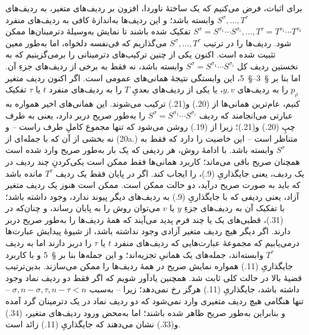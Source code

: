 \documentclass[11pt]{article}
\begin{document}
برای اثبات، فرض می‌کنیم که یک ساختهٔ ناوردا، افزون بر ردیف‌های متغیر، به ردیف‌های $S^\sigma,\ldots,T^\tau$ وابسته باشد؛ و این ردیف‌ها به‌اندازهٔ کافی به ردیف‌های منفرد $S^\sigma=S^{\sigma_1}\cdots S^{\sigma_i},\ldots,T^\tau=T^{\tau_1}\cdots T^{\tau_k}$ تفکیک شده باشند تا نمایش به‌وسیلهٔ دترمینان‌ها ممکن شود. ردیف‌ها را در ترتیب $S^\sigma,\ldots,T^\tau$ می‌گذاریم که فی‌نفسه دلخواه، اما به‌طور معین تثبیت شده است. اکنون یکی از چنین ترکیب‌های دترمینانی را برمی‌گزینیم که به نخستین ردیف کل $S^\sigma=S^{\sigma_1}\cdots S^{\sigma_i}$ وابسته باشد، نه فقط به برخی از ردیف‌های جزءِ آن. اما بنا بر \S\ 3--\S\ 5، این وابستگی نتیجهٔ همانی‌های عمومی است. اگر اکنون ردیف متغیر $p_\rho$ را به ردیف‌های $y,v$، یا یکی از ردیف‌های بعدیِ $T$ را به ردیف‌های منفرد $t$ یا $\tau$ تفکیک کنیم، عام‌ترین همانی‌ها از (20.) و(21.) ترکیب می‌شوند. این همانی‌های اخیر همواره به عبارتی می‌انجامند که ردیف $S^\sigma=S^{\sigma_1}\cdots S^{\sigma_i}$ را به‌طور صریح دربر دارد، یعنی به طرف چپِ (20.) و(21.)؛ زیرا از (19.) روشن می‌شود که تنها مجموع کاملِ طرف راست -- و نه بخشی از آن که با جمله‌ای از (20a.) متناظر است -- این خاصیت را دارد که فقط به $S^\sigma$ وابسته باشد. با ادامهٔ روش، هر ردیفی که یک بار به‌طور صریح وارد شده است همچنان صریح باقی می‌ماند؛ کاربرد همانی‌ها فقط ممکن است یکی‌کردنِ چند ردیف در یک ردیف، یعنی جایگذاریِ (9.)، را ایجاب کند. اگر در پایان فقط یک ردیف $T^\tau$ مانده باشد که باید به صورت صریح درآید، دو حالت ممکن است. ممکن است هنوز یک ردیف متغیر آزاد، یعنی ردیفی که با جایگذاریِ (9.) به ردیف‌های دیگر پیوند ندارد، وجود داشته باشد؛ با تفکیک آن به ردیف‌های جزءِ $y$ یا $v$ می‌توان روش را به پایان رساند، و چنان‌که در (31.)، قطبی‌های یک یا چند فرم پدید می‌آیند که همهٔ ردیف‌ها را به‌طور صریح دربر دارند. اگر دیگر هیچ ردیف متغیر آزادی وجود نداشته باشد، از شیوهٔ پیدایش عبارت‌ها درمی‌یابیم که مجموعهٔ عبارت‌هایی که ردیف‌های منفرد $t$ یا $\tau$ را دربر دارند اما به ردیف $T^\tau$ وابسته‌اند، جمله‌های یک همانیِ تجزیه‌اند؛ و این جمله‌ها بنا بر \S\ 5 و با کاربرد جایگذاریِ (11.) همواره نمایش صریح در همهٔ ردیف‌ها را ممکن می‌سازند. بدین‌ترتیب قضیهٔ بالا در حالت کلی ثابت شد. همچنین یادآور شویم که اگر فقط دو ردیف نماد وجود داشته باشد، جایگذاریِ (11.) هرگز رخ نمی‌دهد؛ زیرا -- به‌سبب $\sigma,n-\sigma,\tau,n-\tau<n$ -- تنها هنگامی هیچ ردیف متغیری وارد نمی‌شود که دو ردیف نماد در یک دترمینان گرد آمده و بنابراین به‌طور صریح ظاهر شده باشند؛ اما به‌محض ورود ردیف‌های متغیر، (34.) و(33.) نشان می‌دهند که جایگذاریِ (11.) زائد است.
\end{document}
